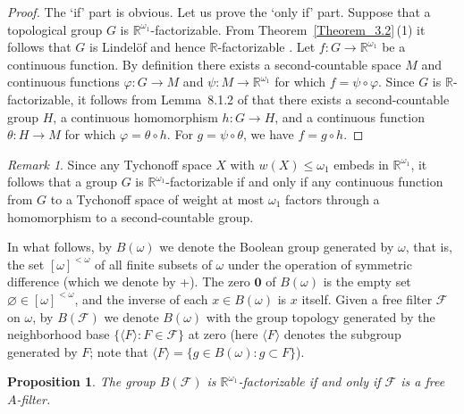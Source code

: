 \documentclass[a4paper,12pt]{amsart}
\newtheorem{proposition}{Proposition}[section]
\theoremstyle{definition}
\theoremstyle{remark}
\newtheorem{remark}{Remark}[section]
\begin{document}
\begin{proof}
The `if' part is obvious. Let us prove the `only if' part. Suppose that a topological group $G$ is $\mathbb 
R^{\omega_1}$-factorizable. 
From Theorem~\ref{Theorem_3.2}\,(1) it follows that $G$ is Lindel\"of and hence $\mathbb R$-factorizable \cite[Assertion~1.1]{T_1991}.
Let $f\colon G\to \mathbb R^{\omega_1}$ be a continuous function. By definition there exists a second-countable space 
$M$ and continuous functions $\varphi\colon G\to M$ and $\psi\colon M\to \mathbb R^{\omega_1}$ for which 
$f=\psi\circ \varphi$. Since $G$ is $\mathbb R$-factorizable, it follows from Lemma~8.1.2 of \cite{A-T} that there 
exists a second-countable group $H$, a continuous homomorphism $h\colon G\to H$, and a continuous function 
$\theta\colon H\to M$ for which $\varphi= \theta\circ h$. For $g=\psi\circ \theta$, we have $f= g\circ h$.
\end{proof}

\begin{remark}
Since any Tychonoff space $X$ with $w(X)\le \omega_1$ embeds in $\mathbb R^{\omega_1}$, it follows that a group 
$G$ is $\mathbb R^{\omega_1}$-factorizable if and only if any continuous function from $G$ to a Tychonoff space of 
weight at most $\omega_1$ factors through a homomorphism to a second-countable group. 
\end{remark}

In what follows, by $B(\omega)$ we denote the Boolean group generated by $\omega$,  
that is, the set $[\omega]^{<\omega}$ of all finite subsets of $\omega$ under the operation of symmetric 
difference (which we denote by +). The zero $\mathbf 0$ of $B(\omega)$ is the empty set $\varnothing \in 
[\omega]^{<\omega}$, and the inverse of each $x\in B(\omega)$ is $x$ itself. Given a free filter $\mathscr F$ 
on $\omega$, by $B(\mathscr F)$ we denote $B(\omega)$ with the group topology generated by the neighborhood base 
$\{\langle F\rangle : F\in \mathscr F\}$ at zero (here $\langle F\rangle $ denotes the subgroup generated by 
$F$; 
note that $\langle F\rangle =\{ g\in B(\omega): g\subset F\}$).

\begin{proposition}
\label{Proposition_5.1}
The group  $B(\mathscr F)$ is $\mathbb R^{\omega_1}$-factorizable if and only if $\mathscr F$ is a free 
$A$-filter. 
\end{proposition}
\end{document}
